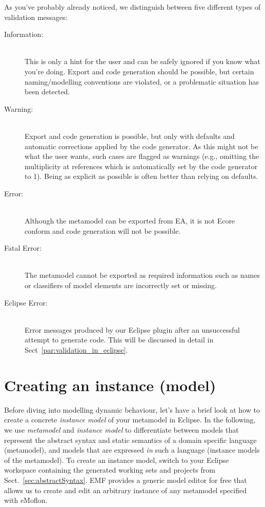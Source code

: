 As you've probably already noticed, we distinguish between five different types of validation messages:
\begin{description}
  \item[Information:]~\\
  This is only a hint for the user and can be safely ignored if you know what you're doing.
  Export and code generation should be possible, but certain naming/modelling conventions are violated, or a problematic situation has been detected.
  \item[Warning:]~\\ Export and code generation is possible, but only with defaults and automatic corrections applied by the code generator.
  As this might not be what the user wants, such cases are flagged as warnings (e.g., omitting the multiplicity at references which is automatically set by the code generator to 1).
  Being as explicit as possible is often better than relying on defaults.
  \item[Error:]~\\ Although the metamodel can be exported from EA, it is not Ecore conform and code generation will not be possible.
  \item[Fatal Error:]~\\ The metamodel cannot be exported as required information such as names or classifiers of model elements are incorrectly set or missing.
  \item[Eclipse Error:]~\\ Error messages produced by our Eclipse plugin after an unsuccessful attempt to generate code.
   This will be discussed in detail in Sect~\ref{par:validation_in_eclipse}.

\end{description}

\section{Creating an instance (model)}
\label{sect:instance}

Before diving into modelling dynamic behaviour, let's have a brief look at how to create a concrete \emph{instance model} of your metamodel in Eclipse.
In the following, we use \emph{metamodel} and \emph{instance model} to differentiate between models that represent the abstract syntax and static semantics of a domain specific language (metamodel), and models that are expressed \emph{in} such a language (instance models of the metamodel).
To create an instance model, switch to your Eclipse workspace containing the generated working sets and projects from Sect.~\ref{sec:abstractSyntax}.
EMF provides a generic model editor for free that allows us to create and edit an arbitrary instance of any metamodel specified with eMoflon.

